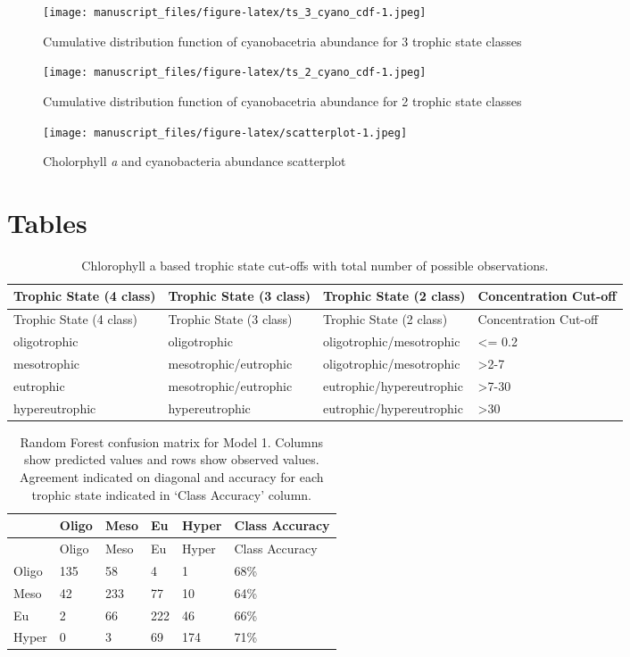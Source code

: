 \documentclass[11pt,]{article}
\begin{document}
\newpage

\begin{figure}[htbp]
\centering
\texttt{[image: manuscript\_files/figure-latex/ts\_3\_cyano\_cdf-1.jpeg]}
\caption{Cumulative distribution function of cyanobacetria abundance for
3 trophic state classes\label{fig:ts_3_cyano_cdf}}
\end{figure}

\newpage

\begin{figure}[htbp]
\centering
\texttt{[image: manuscript\_files/figure-latex/ts\_2\_cyano\_cdf-1.jpeg]}
\caption{Cumulative distribution function of cyanobacetria abundance for
2 trophic state classes\label{fig:ts_2_cyano_cdf}}
\end{figure}

\newpage

\begin{figure}[htbp]
\centering
\texttt{[image: manuscript\_files/figure-latex/scatterplot-1.jpeg]}
\caption{Cholorphyll \emph{a} and cyanobacteria abundance
scatterplot\label{fig:scatterplot}}
\end{figure}

\newpage

\section{Tables}\label{tables}

\begin{longtable}[c]{@{}llll@{}}
\caption{Chlorophyll a based trophic state cut-offs with total number of
possible observations.\label{tab:trophicStateTable}}\tabularnewline
\toprule
Trophic State (4 class) & Trophic State (3 class) & Trophic State (2
class) & Concentration Cut-off\tabularnewline
\midrule
\endfirsthead
\toprule
Trophic State (4 class) & Trophic State (3 class) & Trophic State (2
class) & Concentration Cut-off\tabularnewline
\midrule
\endhead
oligotrophic & oligotrophic & oligotrophic/mesotrophic & \textless{}=
0.2\tabularnewline
mesotrophic & mesotrophic/eutrophic & oligotrophic/mesotrophic &
\textgreater{}2-7\tabularnewline
eutrophic & mesotrophic/eutrophic & eutrophic/hypereutrophic &
\textgreater{}7-30\tabularnewline
hypereutrophic & hypereutrophic & eutrophic/hypereutrophic &
\textgreater{}30\tabularnewline
\bottomrule
\end{longtable}

\newpage

\begin{longtable}[c]{@{}llllll@{}}
\caption{Random Forest confusion matrix for Model 1. Columns show
predicted values and rows show observed values. Agreement indicated on
diagonal and accuracy for each trophic state indicated in `Class
Accuracy' column. \label{tab:Confusion_Model1}}\tabularnewline
\toprule
& Oligo & Meso & Eu & Hyper & Class Accuracy\tabularnewline
\midrule
\endfirsthead
\toprule
& Oligo & Meso & Eu & Hyper & Class Accuracy\tabularnewline
\midrule
\endhead
Oligo & 135 & 58 & 4 & 1 & 68\%\tabularnewline
Meso & 42 & 233 & 77 & 10 & 64\%\tabularnewline
Eu & 2 & 66 & 222 & 46 & 66\%\tabularnewline
Hyper & 0 & 3 & 69 & 174 & 71\%\tabularnewline
\bottomrule
\end{longtable}
\end{document}
